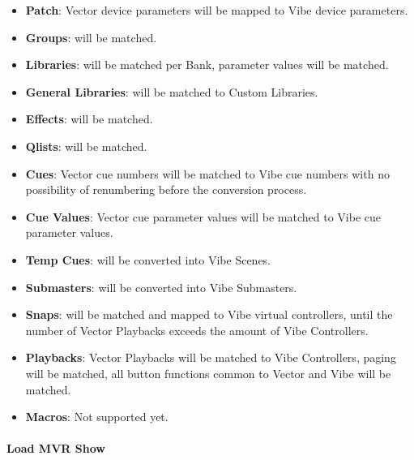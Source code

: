 \documentclass[
]{article}
\providecommand{\tightlist}{%
  \setlength{\itemsep}{0pt}\setlength{\parskip}{0pt}}
\begin{document}
\begin{itemize}
\item
  \textbf{Patch}: Vector device parameters will be mapped to Vibe device parameters.
\item
  \textbf{Groups}: will be matched.
\end{itemize}

\begin{itemize}
\item
  \textbf{Libraries}: will be matched per Bank, parameter values will be matched.
\item
  \textbf{General Libraries}: will be matched to Custom Libraries.
\item
  \textbf{Effects}: will be matched.
\end{itemize}

\begin{itemize}
\tightlist
\item
  \textbf{Qlists}: will be matched.
\end{itemize}

\begin{itemize}
\item
  \textbf{Cues}: Vector cue numbers will be matched to Vibe cue numbers with no possibility of renumbering before the conversion process.
\item
  \textbf{Cue Values}: Vector cue parameter values will be matched to Vibe cue parameter values.
\end{itemize}

\begin{itemize}
\item
  \textbf{Temp Cues}: will be converted into Vibe Scenes.
\item
  \textbf{Submasters}: will be converted into Vibe Submasters.
\item
  \textbf{Snaps}: will be matched and mapped to Vibe virtual controllers, until the number of Vector Playbacks exceeds the amount of Vibe Controllers.
\end{itemize}

\begin{itemize}
\item
  \textbf{Playbacks}: Vector Playbacks will be matched to Vibe Controllers, paging will be matched, all button functions common to Vector and Vibe will be matched.
\item
  \textbf{Macros}: { Not supported yet. }
\end{itemize}

\hypertarget{load-mvr-show}{%
\paragraph{Load MVR Show}\label{load-mvr-show}}
\end{document}
